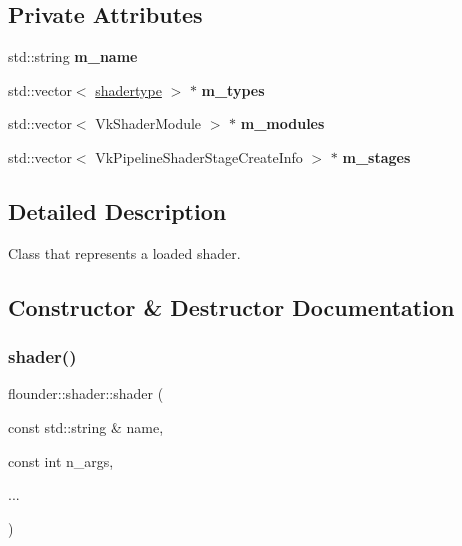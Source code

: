 \subsection*{Private Attributes}
\begin{DoxyCompactItemize}
\item 
\mbox{\label{classflounder_1_1shader_aaf406b4f20956f8ae7ca76dc8daad869}} 
std\+::string {\bfseries m\+\_\+name}
\item 
\mbox{\label{classflounder_1_1shader_ae330ebe9ffb7c2e434a986d4c3d08abd}} 
std\+::vector$<$ \hyperlink{classflounder_1_1shadertype}{shadertype} $>$ $\ast$ {\bfseries m\+\_\+types}
\item 
\mbox{\label{classflounder_1_1shader_ac2eb98572bfcf0504352e0eb207fe967}} 
std\+::vector$<$ Vk\+Shader\+Module $>$ $\ast$ {\bfseries m\+\_\+modules}
\item 
\mbox{\label{classflounder_1_1shader_a7b7834784409ed0ee582c6fdf23a611a}} 
std\+::vector$<$ Vk\+Pipeline\+Shader\+Stage\+Create\+Info $>$ $\ast$ {\bfseries m\+\_\+stages}
\end{DoxyCompactItemize}


\subsection{Detailed Description}
Class that represents a loaded shader. 



\subsection{Constructor \& Destructor Documentation}
\mbox{\label{classflounder_1_1shader_a0ef1d1ad999d4d36cdcbd01aee19fc40}} 
\subsubsection{\texorpdfstring{shader()}{shader()}}
{\footnotesize\ttfamily flounder\+::shader\+::shader (\begin{DoxyParamCaption}\item[{const std\+::string \&}]{name,  }\item[{const int}]{n\+\_\+args,  }\item[{}]{... }\end{DoxyParamCaption})}



